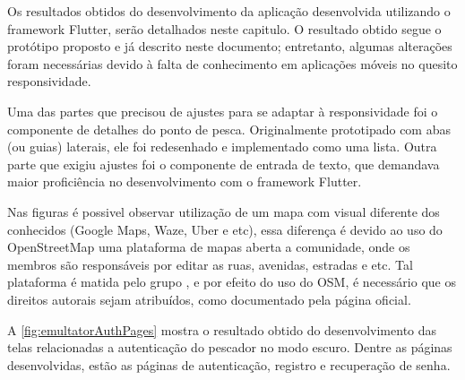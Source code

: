Os resultados obtidos do desenvolvimento da aplicação desenvolvida utilizando o framework Flutter, serão detalhados neste capitulo. O resultado obtido segue o protótipo proposto e já descrito neste documento; entretanto, algumas alterações foram necessárias devido à falta de conhecimento em aplicações móveis no quesito responsividade.

Uma das partes que precisou de ajustes para se adaptar à responsividade foi o componente de detalhes do ponto de pesca. Originalmente prototipado com abas (ou guias) laterais, ele foi redesenhado e implementado como uma lista. Outra parte que exigiu ajustes foi o componente de entrada de texto, que demandava maior proficiência no desenvolvimento com o framework Flutter.

Nas figuras é possivel observar utilização de um mapa com visual diferente dos conhecidos (Google Maps, Waze, Uber e etc), essa diferença é devido ao uso do OpenStreetMap uma plataforma de mapas aberta a comunidade, onde os membros são responsáveis por editar as ruas, avenidas, estradas e etc. Tal plataforma é matida pelo grupo , e por efeito do uso do OSM, é necessário que os direitos autorais sejam atribuídos, como documentado pela página oficial.


A \autoref{fig:emultatorAuthPages} mostra o resultado obtido do desenvolvimento das telas relacionadas a autenticação do pescador no modo escuro. Dentre as páginas desenvolvidas, estão as páginas de autenticação, registro e recuperação de senha.

